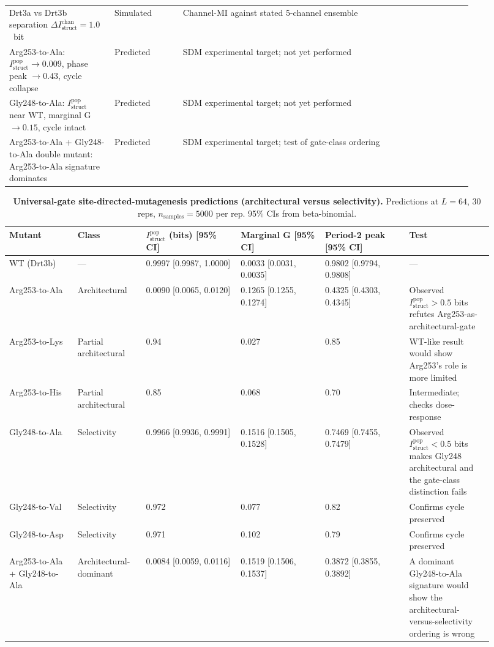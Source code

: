 \documentclass[aps,prx,reprint,amsmath,amssymb,floatfix,superscriptaddress,nofootinbib]{revtex4-2}
\theoremstyle{plain-thm}
\theoremstyle{definition-thm}
\newcommand{\Istructpop}{I_{\mathrm{struct}}^{\mathrm{pop}}}
\newcommand{\Istructchan}{I_{\mathrm{struct}}^{\mathrm{chan}}}
\begin{document}
\begin{table}
\begin{tabular}{p{0.20\linewidth} p{0.13\linewidth} p{0.55\linewidth}}
Drt3a vs Drt3b separation $\Delta\Istructchan = 1.0$~bit & Simulated & Channel-MI against stated 5-channel ensemble \\
Arg253-to-Ala: $\Istructpop \to 0.009$, phase peak $\to 0.43$, cycle collapse & Predicted & SDM experimental target; not yet performed \\
Gly248-to-Ala: $\Istructpop$ near WT, marginal G $\to 0.15$, cycle intact & Predicted & SDM experimental target; not yet performed \\
Arg253-to-Ala + Gly248-to-Ala double mutant: Arg253-to-Ala signature dominates & Predicted & SDM experimental target; test of gate-class ordering \\
\bottomrule
\end{tabular}
\end{table}


\begin{table}
\caption{\textbf{Universal-gate site-directed-mutagenesis predictions (architectural versus selectivity).} Predictions at $L = 64$, 30 reps, $n_{\mathrm{samples}} = 5000$ per rep. 95\% CIs from beta-binomial.}
\label{tab:sdm_predictions}
\begin{tabular}{p{0.13\linewidth} p{0.13\linewidth} p{0.18\linewidth} p{0.16\linewidth} p{0.16\linewidth} p{0.16\linewidth}}
\toprule
Mutant & Class & $\Istructpop$ (bits) [95\% CI] & Marginal G [95\% CI] & Period-2 peak [95\% CI] & Test \\
\midrule
WT (Drt3b) & --- & 0.9997 [0.9987, 1.0000] & 0.0033 [0.0031, 0.0035] & 0.9802 [0.9794, 0.9808] & --- \\
Arg253-to-Ala & Architectural & 0.0090 [0.0065, 0.0120] & 0.1265 [0.1255, 0.1274] & 0.4325 [0.4303, 0.4345] & Observed $\Istructpop > 0.5$ bits refutes Arg253-as-architectural-gate \\
Arg253-to-Lys & Partial architectural & 0.94 & 0.027 & 0.85 & WT-like result would show Arg253's role is more limited \\
Arg253-to-His & Partial architectural & 0.85 & 0.068 & 0.70 & Intermediate; checks dose-response \\
Gly248-to-Ala & Selectivity & 0.9966 [0.9936, 0.9991] & 0.1516 [0.1505, 0.1528] & 0.7469 [0.7455, 0.7479] & Observed $\Istructpop < 0.5$ bits makes Gly248 architectural and the gate-class distinction fails \\
Gly248-to-Val & Selectivity & 0.972 & 0.077 & 0.82 & Confirms cycle preserved \\
Gly248-to-Asp & Selectivity & 0.971 & 0.102 & 0.79 & Confirms cycle preserved \\
Arg253-to-Ala + Gly248-to-Ala & Architectural-dominant & 0.0084 [0.0059, 0.0116] & 0.1519 [0.1506, 0.1537] & 0.3872 [0.3855, 0.3892] & A dominant Gly248-to-Ala signature would show the architectural-versus-selectivity ordering is wrong \\
\bottomrule
\end{tabular}
\end{table}
\end{document}
